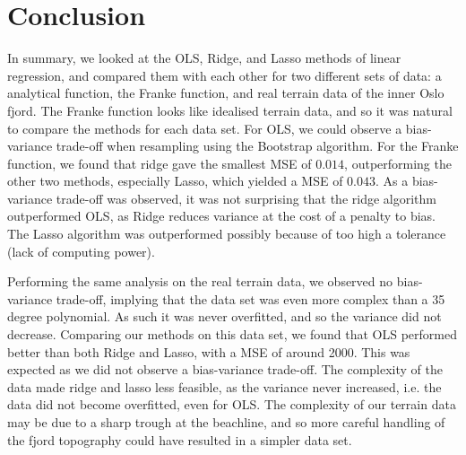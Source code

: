 \section{Conclusion}
\label{sec:conclusion}


In summary, we looked at the OLS, Ridge, and Lasso methods of linear regression, and compared them with each other for two different sets of data: a analytical function, the Franke function, and real terrain data of the inner Oslo fjord. The Franke function looks like idealised terrain data, and so it was natural to compare the methods for each data set. For OLS, we could observe a bias-variance trade-off when resampling using the Bootstrap algorithm. For the Franke function, we found that ridge gave the smallest MSE of $0.014$, outperforming the other two methods, especially Lasso, which yielded a MSE of $0.043$. As a bias-variance trade-off was observed, it was not surprising that the ridge algorithm outperformed OLS, as Ridge reduces variance at the cost of a penalty to bias. The Lasso algorithm was outperformed possibly because of too high a tolerance (lack of computing power).

Performing the same analysis on the real terrain data, we observed no bias-variance trade-off, implying that the data set was even more complex than a 35 degree polynomial. As such it was never overfitted, and so the variance did not decrease. Comparing our methods on this data set, we found that OLS performed better than both Ridge and Lasso, with a MSE of around 2000. This was expected as we did not observe a bias-variance trade-off. The complexity of the data made ridge and lasso less feasible, as the variance never increased, i.e. the data did not become overfitted, even for OLS. The complexity of our terrain data may be due to a sharp trough at the beachline, and so more careful handling of the fjord topography could have resulted in a simpler data set.
